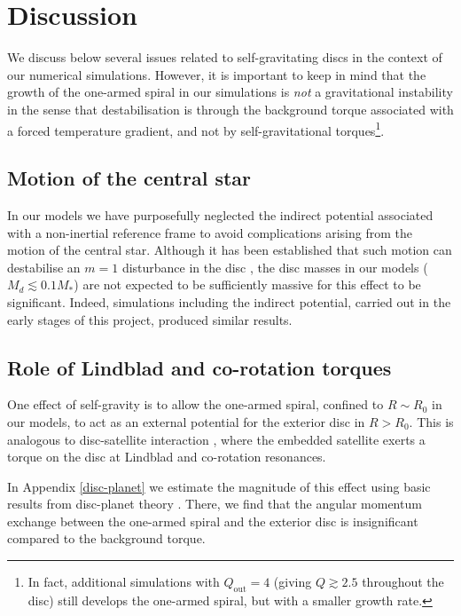 \section{Discussion}\label{discussions} 

  We discuss below several issues related to self-gravitating
  discs in the context of our numerical simulations. However, it is
  important to keep in mind that 
  the growth of the one-armed spiral in our simulations is
  \emph{not} a gravitational instability in the sense that
  destabilisation is through the background torque associated with a
  forced temperature gradient, and not by self-gravitational torques\footnote{In fact, additional simulations with $Q_\mathrm{out}=4$ (giving $Q\gtrsim2.5$ throughout the disc) still 
  develops the one-armed spiral, but with a smaller growth rate.}. 


  \subsection{Motion of the central star} 
  In our models we have purposefully neglected the indirect potential
  associated with a non-inertial reference frame to avoid
  complications arising from the motion of the central star.  
  Although it has been established that such motion can destabilise an
  $m=1$ disturbance in the disc \citep{adams89,shu90,michael10}, 
  the disc masses in our models ($M_d\lesssim 
  0.1 M_*$) are not expected to be sufficiently massive for this effect to be
  significant. Indeed, simulations including the
  indirect potential, carried out in the early stages of this project,
  produced similar results.    
  
  \subsection{Role of Lindblad and co-rotation torques}
  One effect of self-gravity is to allow the one-armed spiral,
  confined to $R\sim R_0$ in our models, to act as an external potential for the
  exterior disc in $R>R_0$. This is 
  analogous to disc-satellite interaction 
  \citep{goldreich79}, where the embedded satellite exerts a torque on
  the disc at Lindblad and co-rotation resonances. 

  In Appendix \ref{disc-planet} we estimate the magnitude of this effect
  using basic results from disc-planet theory \citep[see, e.g.][and
  references therein]{papaloizou07}. There, we find that the angular
  momentum exchange between the one-armed spiral and the exterior disc
  is insignificant compared to the background torque.  
  

